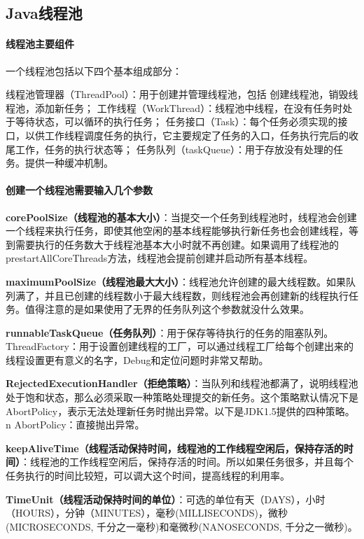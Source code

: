 \documentclass[../../../interview-questions.tex]{subfiles}
\begin{document}
\subsection{Java线程池}

\paragraph{线程池主要组件}

一个线程池包括以下四个基本组成部分：

线程池管理器（ThreadPool）：用于创建并管理线程池，包括 创建线程池，销毁线程池，添加新任务；
工作线程（WorkThread）：线程池中线程，在没有任务时处于等待状态，可以循环的执行任务；
任务接口（Task）：每个任务必须实现的接口，以供工作线程调度任务的执行，它主要规定了任务的入口，任务执行完后的收尾工作，任务的执行状态等；
任务队列（taskQueue）：用于存放没有处理的任务。提供一种缓冲机制。

\paragraph{创建一个线程池需要输入几个参数}

\textbf{corePoolSize（线程池的基本大小）}：当提交一个任务到线程池时，线程池会创建一个线程来执行任务，即使其他空闲的基本线程能够执行新任务也会创建线程，等到需要执行的任务数大于线程池基本大小时就不再创建。如果调用了线程池的prestartAllCoreThreads方法，线程池会提前创建并启动所有基本线程。

\textbf{maximumPoolSize（线程池最大大小）}：线程池允许创建的最大线程数。如果队列满了，并且已创建的线程数小于最大线程数，则线程池会再创建新的线程执行任务。值得注意的是如果使用了无界的任务队列这个参数就没什么效果。

\textbf{runnableTaskQueue（任务队列）}：用于保存等待执行的任务的阻塞队列。
ThreadFactory：用于设置创建线程的工厂，可以通过线程工厂给每个创建出来的线程设置更有意义的名字，Debug和定位问题时非常又帮助。

\textbf{RejectedExecutionHandler（拒绝策略）}：当队列和线程池都满了，说明线程池处于饱和状态，那么必须采取一种策略处理提交的新任务。这个策略默认情况下是AbortPolicy，表示无法处理新任务时抛出异常。以下是JDK1.5提供的四种策略。n  AbortPolicy：直接抛出异常。

\textbf{keepAliveTime（线程活动保持时间，线程池的​​工作线程空闲后​​​，​​保持存活的时间​​​）}：线程池的工作线程空闲后，保持存活的时间。所以如果任务很多，并且每个任务执行的时间比较短，可以调大这个时间，提高线程的利用率。

\textbf{TimeUnit（线程活动保持时间的单位）}：可选的单位有天（DAYS），小时（HOURS），分钟（MINUTES），毫秒(MILLISECONDS)，微秒(MICROSECONDS, 千分之一毫秒)和毫微秒(NANOSECONDS, 千分之一微秒)。
\end{document}

